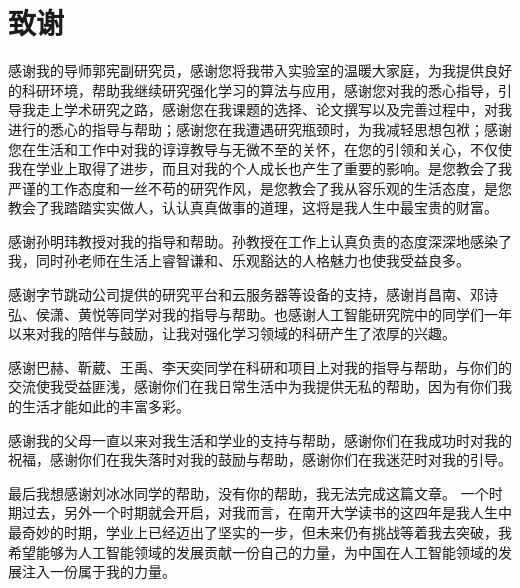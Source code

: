 
\chapter*{致谢}

感谢我的导师郭宪副研究员，感谢您将我带入实验室的温暖大家庭，为我提供良好的科研环境，帮助我继续研究强化学习的算法与应用，感谢您对我的悉心指导，引导我走上学术研究之路，感谢您在我课题的选择、论文撰写以及完善过程中，对我进行的悉心的指导与帮助；感谢您在我遭遇研究瓶颈时，为我减轻思想包袱；感谢您在生活和工作中对我的谆谆教导与无微不至的关怀，在您的引领和关心，不仅使我在学业上取得了进步，而且对我的个人成长也产生了重要的影响。是您教会了我严谨的工作态度和一丝不苟的研究作风，是您教会了我从容乐观的生活态度，是您教会了我踏踏实实做人，认认真真做事的道理，这将是我人生中最宝贵的财富。

感谢孙明玮教授对我的指导和帮助。孙教授在工作上认真负责的态度深深地感染了我，同时孙老师在生活上睿智谦和、乐观豁达的人格魅力也使我受益良多。

感谢字节跳动公司提供的研究平台和云服务器等设备的支持，感谢肖昌南、邓诗弘、侯潇、黄悦等同学对我的指导与帮助。也感谢人工智能研究院中的同学们一年以来对我的陪伴与鼓励，让我对强化学习领域的科研产生了浓厚的兴趣。

感谢巴赫、靳葳、王禹、李天奕同学在科研和项目上对我的指导与帮助，与你们的交流使我受益匪浅，感谢你们在我日常生活中为我提供无私的帮助，因为有你们我的生活才能如此的丰富多彩。

感谢我的父母一直以来对我生活和学业的支持与帮助，感谢你们在我成功时对我的祝福，感谢你们在我失落时对我的鼓励与帮助，感谢你们在我迷茫时对我的引导。

最后我想感谢刘冰冰同学的帮助，没有你的帮助，我无法完成这篇文章。
一个时期过去，另外一个时期就会开启，对我而言，在南开大学读书的这四年是我人生中最奇妙的时期，学业上已经迈出了坚实的一步，但未来仍有挑战等着我去突破，我希望能够为人工智能领域的发展贡献一份自己的力量，为中国在人工智能领域的发展注入一份属于我的力量。
